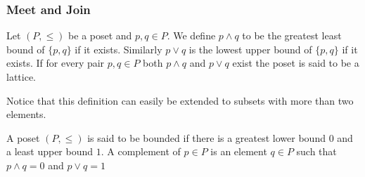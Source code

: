 \documentclass{beamer}
\begin{document}
\begin{frame}

	\frametitle{Meet and Join}
	
	\begin{definition}
	
		Let $(P,\leq)$ be a poset and $p,q\in P$. We define $p\wedge q$ to be the greatest least bound of $\{p,q\}$ if it exists. Similarly $p\vee q$ is the lowest upper bound of $\{p,q\}$ if it exists.	If for every pair $p,q\in P$ both $p\wedge q$ and $p\vee q$ exist the poset is said to be a lattice.
	
	\end{definition}

	Notice that this definition can easily be extended to subsets with more than two elements.

	\begin{definition}
		
		A poset $(P,\leq)$ is said to be bounded if there is a greatest lower bound $0$ and a least upper bound $1$. A complement of $p\in P$ is an element $q\in P$ such that $p\wedge q=0$ and $p\vee q=1$		
		
	\end{definition}

\end{frame}
\end{document}
